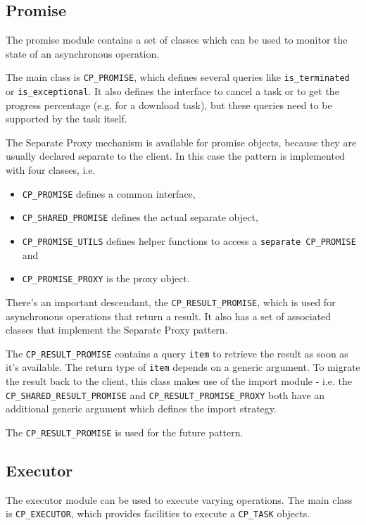 \documentclass[a4paper,10pt]{report}
\begin{document}
\subsection{Promise}

The promise module contains a set of classes which can be used to monitor the state of an asynchronous operation.

The main class is \lstinline!CP_PROMISE!, which defines several queries like \lstinline!is_terminated! or \lstinline!is_exceptional!.
It also defines the interface to cancel a task or to get the progress percentage (e.g. for a download task), but these queries need to be supported by the task itself.

The Separate Proxy mechanism is available for promise objects, because they are usually declared separate to the client.
In this case the pattern is implemented with four classes, i.e.
\begin{itemize}
 \item \lstinline!CP_PROMISE! defines a common interface,
 \item \lstinline!CP_SHARED_PROMISE! defines the actual separate object,
 \item \lstinline!CP_PROMISE_UTILS! defines helper functions to access a \lstinline!separate CP_PROMISE! and
 \item \lstinline!CP_PROMISE_PROXY! is the proxy object.
\end{itemize}

There's an important descendant, the \lstinline!CP_RESULT_PROMISE!, which is used for asynchronous operations that return a result.
It also has a set of associated classes that implement the Separate Proxy pattern.

The \lstinline!CP_RESULT_PROMISE! contains a query \lstinline!item! to retrieve the result as soon as it's available.
The return type of \lstinline!item! depends on a generic argument.
To migrate the result back to the client, this class makes use of the import module - i.e. the \lstinline!CP_SHARED_RESULT_PROMISE! and \lstinline!CP_RESULT_PROMISE_PROXY! both have an additional generic argument which defines the import strategy.

The \lstinline!CP_RESULT_PROMISE! is used for the future pattern.

\subsection{Executor}

The executor module can be used to execute varying operations.
The main class is \lstinline!CP_EXECUTOR!, which provides facilities to execute a \lstinline!CP_TASK! objects.
\end{document}
